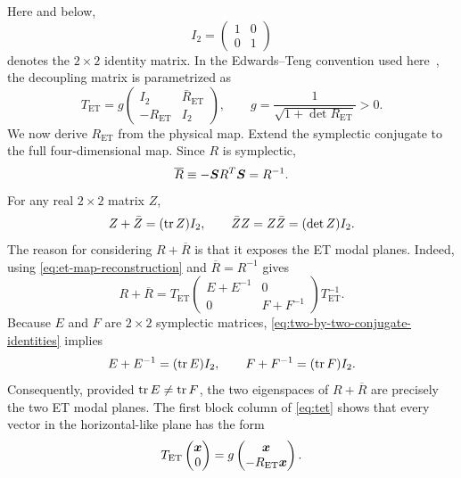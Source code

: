 Here and below,
\begin{equation}
 I_2=\begin{pmatrix}1&0\\0&1\end{pmatrix}
\end{equation}
denotes the $2\times2$ identity matrix.  In the Edwards--Teng convention used
here~\cite{EdwardsTeng}, the decoupling matrix is parametrized as
\begin{equation}
 T_{\mathrm{ET}}
 =g
 \begin{pmatrix}
  I_2&\bar R_{\mathrm{ET}}\\
  -R_{\mathrm{ET}}&I_2
 \end{pmatrix},
 \qquad
 g=\frac{1}{\sqrt{1+\det R_{\mathrm{ET}}}}>0.
 \label{eq:tet}
\end{equation}
We now derive $R_{\mathrm{ET}}$ from the physical map.  Extend the symplectic
conjugate to the full four-dimensional map.  Since $R$ is symplectic,
\begin{equation}
 \overline R\equiv-\bm{S} R^T\bm{S}=R^{-1}.
\end{equation}
For any real $2\times2$ matrix $Z$,
\begin{equation}
 Z+\bar Z=(\operatorname{tr} Z)I_2,
 \qquad
 \bar Z Z=Z\bar Z=(\det Z)I_2.
 \label{eq:two-by-two-conjugate-identities}
\end{equation}
The reason for considering $R+\overline R$ is that it exposes the ET modal
planes.  Indeed, using \cref{eq:et-map-reconstruction} and
$\overline R=R^{-1}$ gives
\begin{equation}
 R+\overline R
 =T_{\mathrm{ET}}
  \begin{pmatrix}
   E+E^{-1}&0\\0&F+F^{-1}
  \end{pmatrix}
  T_{\mathrm{ET}}^{-1}.
 \label{eq:R-plus-Rbar-et-basis}
\end{equation}
Because $E$ and $F$ are $2\times2$ symplectic matrices,
\cref{eq:two-by-two-conjugate-identities} implies
\begin{equation}
 E+E^{-1}=(\operatorname{tr} E)I_2,
 \qquad
 F+F^{-1}=(\operatorname{tr} F)I_2.
 \label{eq:modal-map-plus-inverse}
\end{equation}
Consequently, provided $\operatorname{tr} E\ne\operatorname{tr} F$, the two eigenspaces of
$R+\overline R$ are precisely the two ET modal planes.  The first block
column of \cref{eq:tet} shows that every vector in the horizontal-like plane
has the form
\begin{equation}
 T_{\mathrm{ET}}
 \begin{pmatrix}\bm{x}\\0\end{pmatrix}
 =g\begin{pmatrix}\bm{x}\\-R_{\mathrm{ET}}\bm{x}\end{pmatrix}.
 \label{eq:first-et-plane-from-tet}
\end{equation}
